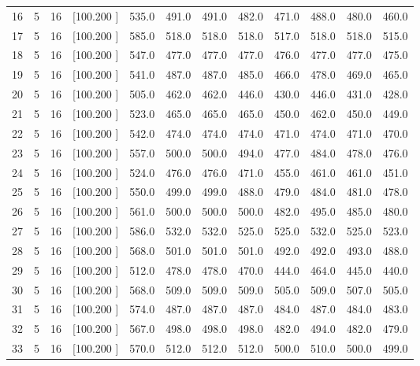 \documentclass[12pt,a4paper]{article}
\begin{document}
\begin{center}
{\begin{tabular}{r r r r r r r r r r r r}
  16&  5& 16&[100.200   ]&   535.0&   491.0&   491.0&   482.0&   471.0&   488.0&   480.0&   460.0\\[-0.02in]
  17&  5& 16&[100.200   ]&   585.0&   518.0&   518.0&   518.0&   517.0&   518.0&   518.0&   515.0\\[-0.02in]
  18&  5& 16&[100.200   ]&   547.0&   477.0&   477.0&   477.0&   476.0&   477.0&   477.0&   475.0\\[-0.02in]
  19&  5& 16&[100.200   ]&   541.0&   487.0&   487.0&   485.0&   466.0&   478.0&   469.0&   465.0\\[-0.02in]
  20&  5& 16&[100.200   ]&   505.0&   462.0&   462.0&   446.0&   430.0&   446.0&   431.0&   428.0\\[-0.02in]
  21&  5& 16&[100.200   ]&   523.0&   465.0&   465.0&   465.0&   450.0&   462.0&   450.0&   449.0\\[-0.02in]
  22&  5& 16&[100.200   ]&   542.0&   474.0&   474.0&   474.0&   471.0&   474.0&   471.0&   470.0\\[-0.02in]
  23&  5& 16&[100.200   ]&   557.0&   500.0&   500.0&   494.0&   477.0&   484.0&   478.0&   476.0\\[-0.02in]
  24&  5& 16&[100.200   ]&   524.0&   476.0&   476.0&   471.0&   455.0&   461.0&   461.0&   451.0\\[-0.02in]
  25&  5& 16&[100.200   ]&   550.0&   499.0&   499.0&   488.0&   479.0&   484.0&   481.0&   478.0\\[-0.02in]
  26&  5& 16&[100.200   ]&   561.0&   500.0&   500.0&   500.0&   482.0&   495.0&   485.0&   480.0\\[-0.02in]
  27&  5& 16&[100.200   ]&   586.0&   532.0&   532.0&   525.0&   525.0&   532.0&   525.0&   523.0\\[-0.02in]
  28&  5& 16&[100.200   ]&   568.0&   501.0&   501.0&   501.0&   492.0&   492.0&   493.0&   488.0\\[-0.02in]
  29&  5& 16&[100.200   ]&   512.0&   478.0&   478.0&   470.0&   444.0&   464.0&   445.0&   440.0\\[-0.02in]
  30&  5& 16&[100.200   ]&   568.0&   509.0&   509.0&   509.0&   505.0&   509.0&   507.0&   505.0\\[-0.02in]
  31&  5& 16&[100.200   ]&   574.0&   487.0&   487.0&   487.0&   484.0&   487.0&   484.0&   483.0\\[-0.02in]
  32&  5& 16&[100.200   ]&   567.0&   498.0&   498.0&   498.0&   482.0&   494.0&   482.0&   479.0\\[-0.02in]
  33&  5& 16&[100.200   ]&   570.0&   512.0&   512.0&   512.0&   500.0&   510.0&   500.0&   499.0\\[-0.02in]

\end{tabular}}
\end{center}
\end{document}
